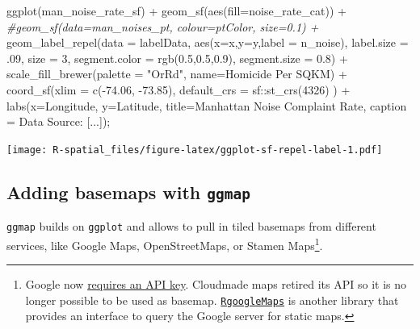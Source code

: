 \documentclass[
  11pt,
]{book}
\newenvironment{Shaded}{\begin{snugshade}}{\end{snugshade}}
\newcommand{\AttributeTok}[1]{\textcolor[rgb]{0.77,0.63,0.00}{#1}}
\newcommand{\CommentTok}[1]{\textcolor[rgb]{0.56,0.35,0.01}{\textit{#1}}}
\newcommand{\DecValTok}[1]{\textcolor[rgb]{0.00,0.00,0.81}{#1}}
\newcommand{\FloatTok}[1]{\textcolor[rgb]{0.00,0.00,0.81}{#1}}
\newcommand{\FunctionTok}[1]{\textcolor[rgb]{0.00,0.00,0.00}{#1}}
\newcommand{\NormalTok}[1]{#1}
\newcommand{\SpecialCharTok}[1]{\textcolor[rgb]{0.00,0.00,0.00}{#1}}
\newcommand{\StringTok}[1]{\textcolor[rgb]{0.31,0.60,0.02}{#1}}
\begin{document}
\begin{Shaded}
\begin{Highlighting}[]
\FunctionTok{ggplot}\NormalTok{(man\_noise\_rate\_sf) }\SpecialCharTok{+} 
  \FunctionTok{geom\_sf}\NormalTok{(}\FunctionTok{aes}\NormalTok{(}\AttributeTok{fill=}\NormalTok{noise\_rate\_cat)) }\SpecialCharTok{+}
  \CommentTok{\#geom\_sf(data=man\_noises\_pt, colour=ptColor, size=0.1) +}
  \FunctionTok{geom\_label\_repel}\NormalTok{(}\AttributeTok{data =}\NormalTok{ labelData,}
                   \FunctionTok{aes}\NormalTok{(}\AttributeTok{x=}\NormalTok{x,}\AttributeTok{y=}\NormalTok{y,}\AttributeTok{label =}\NormalTok{ n\_noise),}
                   \AttributeTok{label.size =}\NormalTok{ .}\DecValTok{09}\NormalTok{,}
                   \AttributeTok{size =} \DecValTok{3}\NormalTok{,}
                   \AttributeTok{segment.color =} \FunctionTok{rgb}\NormalTok{(}\FloatTok{0.5}\NormalTok{,}\FloatTok{0.5}\NormalTok{,}\FloatTok{0.9}\NormalTok{),}
                   \AttributeTok{segment.size =} \FloatTok{0.8}\NormalTok{) }\SpecialCharTok{+}
  \FunctionTok{scale\_fill\_brewer}\NormalTok{(}\AttributeTok{palette =} \StringTok{"OrRd"}\NormalTok{, }\AttributeTok{name=}\StringTok{\textquotesingle{}Homicide Per SQKM\textquotesingle{}}\NormalTok{) }\SpecialCharTok{+}
  \FunctionTok{coord\_sf}\NormalTok{(}\AttributeTok{xlim =} \FunctionTok{c}\NormalTok{(}\SpecialCharTok{{-}}\FloatTok{74.06}\NormalTok{, }\SpecialCharTok{{-}}\FloatTok{73.85}\NormalTok{), }\AttributeTok{default\_crs =}\NormalTok{ sf}\SpecialCharTok{::}\FunctionTok{st\_crs}\NormalTok{(}\DecValTok{4326}\NormalTok{) ) }\SpecialCharTok{+}
  \FunctionTok{labs}\NormalTok{(}\AttributeTok{x=}\StringTok{\textquotesingle{}Longitude\textquotesingle{}}\NormalTok{, }\AttributeTok{y=}\StringTok{\textquotesingle{}Latitude\textquotesingle{}}\NormalTok{, }
       \AttributeTok{title=}\StringTok{\textquotesingle{}Manhattan Noise Complaint Rate\textquotesingle{}}\NormalTok{,}
       \AttributeTok{caption =} \StringTok{\textquotesingle{}Data Source: [...]\textquotesingle{}}\NormalTok{);}
\end{Highlighting}
\end{Shaded}

\texttt{[image: R-spatial\_files/figure-latex/ggplot-sf-repel-label-1.pdf]}

\hypertarget{adding-basemaps-with-ggmap}{%
\subsection{\texorpdfstring{Adding basemaps with \texttt{ggmap}}{Adding basemaps with ggmap}}\label{adding-basemaps-with-ggmap}}

\texttt{ggmap} builds on \texttt{ggplot} and allows to pull in tiled basemaps from different services, like Google Maps, OpenStreetMaps, or Stamen Maps\footnote{Google now \href{https://cloud.google.com/maps-platform/.}{requires an API key}. Cloudmade maps retired its API so it is no longer possible to be used as basemap. \href{https://CRAN.R-project.org/package=RgoogleMaps}{\texttt{RgoogleMaps}} is another library that provides an interface to query the Google server for static maps.}.
\end{document}
